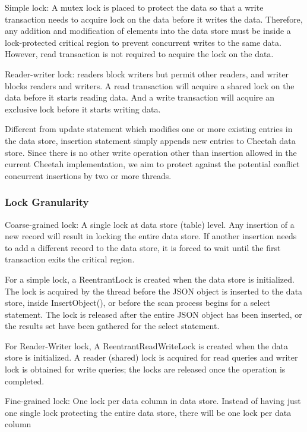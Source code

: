 \documentclass[11pt,journal,compsoc]{IEEEtran}
\begin{document}
Simple lock: A mutex lock is placed to protect the data so that a write transaction needs to acquire lock on the data before it writes the data. Therefore, any addition and modification of elements into the data store must be inside a lock-protected critical region to prevent concurrent writes to the same data. However, read transaction is not required to acquire the lock on the data.
 
Reader-writer lock: readers block writers but permit other readers, and writer blocks readers and writers. A read transaction will acquire a shared lock on the data before it starts reading data. And a write transaction will acquire an exclusive lock before it starts writing data.
 
Different from update statement which modifies one or more existing entries in the data store, insertion statement simply appends new entries to Cheetah data store. Since there is no other write operation other than insertion allowed in the current Cheetah implementation, we aim to protect against the potential conflict concurrent insertions by two or more threads.

\subsubsection{Lock Granularity}
Coarse-grained lock: A single lock at data store (table) level. Any insertion of a new record will result in locking the entire data store. If another insertion needs to add a different record to the data store, it is forced to wait until the first transaction exits the critical region.
 
For a simple lock, a ReentrantLock is created when the data store is initialized. The lock is acquired by the thread before the JSON object is inserted to the data store, inside InsertObject(), or before the scan process begins for a select statement.  The lock is released after the entire JSON object has been inserted, or the results set have been gathered for the select statement.

For Reader-Writer lock, A ReentrantReadWriteLock is created when the data store is initialized. A reader (shared) lock is acquired for read queries and writer lock is obtained for write queries; the locks are released once the operation is completed.
 
Fine-grained lock: One lock per data column in data store. Instead of having just one single lock protecting the entire data store, there will be one lock per data column
 
\end{document}
